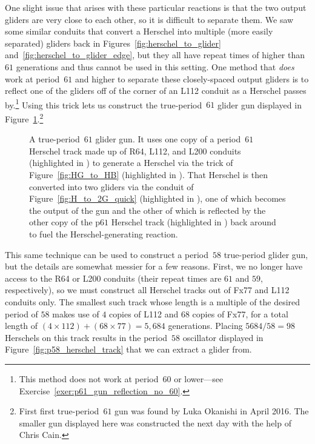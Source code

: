 One slight issue that arises with these particular reactions is that the two output gliders are very close to each other, so it is difficult to separate them. We saw some similar conduits that convert a Herschel into multiple (more easily separated) gliders back in Figures~\ref{fig:herschel_to_glider} and~\ref{fig:herschel_to_glider_edge}, but they all have repeat times of higher than $61$ generations and thus cannot be used in this setting. One method that \emph{does} work at period~$61$ and higher to separate these closely-spaced output gliders is to reflect one of the gliders off of the corner of an L112 conduit as a Herschel passes by.\footnote{This method does not work at period~$60$ or lower---see Exercise~\ref{exer:p61_gun_reflection_no_60}.} Using this trick lets us construct the true-period~$61$ glider gun displayed in Figure~\ref{fig:p61_gun}.\footnote{First first true-period~$61$ gun was found by Luka Okanishi in April 2016. The smaller gun displayed here was constructed the next day with the help of Chris Cain.}

\begin{figure}[!htb]
	\centering
	\caption{A true-period~$61$ glider gun. It uses one copy of a period~$61$ Herschel track made up of R64, L112, and L200 conduits (highlighted in ) to generate a Herschel via the trick of Figure~\ref{fig:HG_to_HB} (highlighted in ). That Herschel is then converted into two gliders via the conduit of Figure~\ref{fig:H_to_2G_quick} (highlighted in ), one of which becomes the output of the gun and the other of which is reflected by the other copy of the p$61$ Herschel track (highlighted in ) back around to fuel the Herschel-generating reaction.}\label{fig:p61_gun}
\end{figure}

This same technique can be used to construct a period~$58$ true-period glider gun, but the details are somewhat messier for a few reasons. First, we no longer have access to the R64 or L200 conduits (their repeat times are $61$ and $59$, respectively), so we must construct all Herschel tracks out of Fx77 and L112 conduits only. The smallest such track whose length is a multiple of the desired period of $58$ makes use of $4$ copies of L112 and $68$ copies of Fx77, for a total length of $(4 \times 112) + (68 \times 77) = 5,684$ generations. Placing $5684/58 = 98$ Herschels on this track results in the period~$58$ oscillator displayed in Figure~\ref{fig:p58_herschel_track} that we can extract a glider from.

